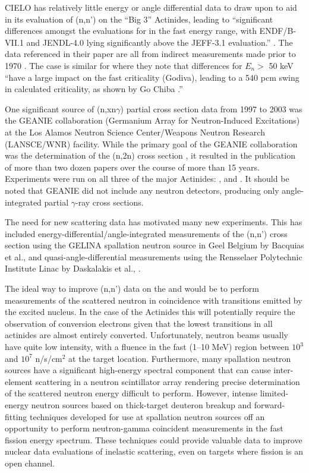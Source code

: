 \documentclass[letterpaper]{ar-1col}
\begin{document}
CIELO has relatively little energy or angle differential data to draw upon to aid in its evaluation of (n,n') on the \enquote{Big 3} Actinides, leading to \enquote{significant differences amongst the evaluations for  in the fast energy range, with ENDF/B-VII.1 and JENDL-4.0 lying significantly above the JEFF-3.1 evaluation.} \cite{Cha14}.  The  data referenced in their paper are all from indirect measurements made prior to 1970 \cite{Bat69, And61}.  The case is similar for  where they note that differences for $E_n >$ 50 keV \enquote{have a large impact on the fast criticality (Godiva), leading to a 540 pcm swing in calculated criticality, as shown by Go Chiba \cite{Chi12}.}

One significant source of (n,xn$\gamma$) partial cross section data from 1997 to 2003 was the GEANIE collaboration (Germanium Array for Neutron-Induced Excitations) at the Los Alamos Neutron Science Center/Weapons Neutron Research (LANSCE/WNR) facility. While the primary goal of the GEANIE collaboration was the determination of the (n,2n) cross section \cite{Ber02}, it resulted in the publication of more than two dozen papers over the course of more than 15 years.  Experiments were run on all three of the major Actinides:  \cite{You01},  \cite{Ber02} and  \cite{Fot04}.  It should be noted that GEANIE did not include any neutron detectors, producing only angle-integrated partial $\gamma$-ray cross sections.  

The need for new scattering data has motivated many new experiments.  This has included energy-differential/angle-integrated measurements of the (n,n') cross section using the GELINA spallation neutron source in Geel Belgium by Bacquias et al., \cite{Nem13} and quasi-angle-differential measurements using the Rensselaer Polytechnic Institute Linac by Daskalakis et al., \cite{Das14}. 

The ideal way to improve (n,n') data on the  and  would be to perform measurements of the scattered neutron in coincidence with transitions emitted by the excited nucleus.  In the case of the Actinides this will potentially require the observation of conversion electrons given that the lowest transitions in all actinides are almost entirely converted.  Unfortunately, neutron beams usually have quite low intensity, with a fluence in the fast (1--10 MeV) region between $10^3$ and $10^7$ n/s/cm$^2$ at the target location.  Furthermore, many spallation neutron sources have a significant high-energy spectral component that can cause inter-element scattering in a neutron scintillator array rendering precise determination of the scattered neutron energy difficult to  perform. However, intense limited-energy neutron sources based on thick-target deuteron breakup \cite{Harrig2018} and forward-fitting techniques developed for use at spallation neutron sources \cite{Kee18} off an opportunity to perform neutron-gamma coincident measurements in the fast fission energy spectrum.  These techniques could provide valuable data to improve nuclear data evaluations of inelastic scattering, even on targets where fission is an open channel. 
\end{document}
